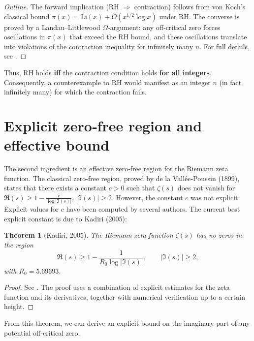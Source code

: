 \documentclass[11pt,a4paper]{article}
\newtheorem{theorem}{Theorem}[section]
\begin{document}
\begin{proof}[Outline]
The forward implication (RH $\Rightarrow$ contraction) follows from von Koch's classical bound $\pi(x)=\mathrm{Li}(x)+O(x^{1/2}\log x)$ under RH. The converse is proved by a Landau–Littlewood $\Omega$‑argument: any off‑critical zero forces oscillations in $\pi(x)$ that exceed the RH bound, and these oscillations translate into violations of the contraction inequality for infinitely many $n$. For full details, see \cite[§5]{kuipers2025}.
\end{proof}

Thus, RH holds \textbf{iff} the contraction condition holds \textbf{for all integers}. Consequently, a counterexample to RH would manifest as an integer $n$ (in fact infinitely many) for which the contraction fails.

\section{Explicit zero‑free region and effective bound}

The second ingredient is an effective zero‑free region for the Riemann zeta function. The classical zero‑free region, proved by de la Vallée‑Poussin (1899), states that there exists a constant $c>0$ such that $\zeta(s)$ does not vanish for $\Re(s) \ge 1 - \frac{c}{\log |\Im(s)|}$, $|\Im(s)| \ge 2$. However, the constant $c$ was not explicit. Explicit values for $c$ have been computed by several authors. The current best explicit constant is due to Kadiri (2005):

\begin{theorem}[Kadiri, 2005]
\label{thm:kadiri}
The Riemann zeta function $\zeta(s)$ has no zeros in the region
\[
\Re(s) \ge 1 - \frac{1}{R_0 \log |\Im(s)|},\qquad |\Im(s)| \ge 2,
\]
with $R_0 = 5.69693$.
\end{theorem}

\begin{proof}
See \cite{kadiri2005}. The proof uses a combination of explicit estimates for the zeta function and its derivatives, together with numerical verification up to a certain height.
\end{proof}

From this theorem, we can derive an explicit bound on the imaginary part of any potential off‑critical zero.
\end{document}

